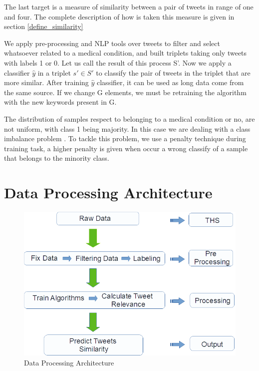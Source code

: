 \documentclass[12pt]{report}
\begin{document}
The last target is a measure of similarity between a pair of tweets in range of one and four. The complete description of how is taken this measure is given in section \ref{define_similarity}

We apply pre-processing and \ac{NLP} tools over tweets to filter and select whatsoever related to a medical condition, and built triplets taking only tweets with labels 1 or 0. Let us call the result of this process S'. Now we apply a classifier $\hat{y}$ in a triplet $s' \in S'$ to classify the pair of tweets in the triplet that are more similar. After training $\hat{y}$ classifier, it can be used as long data come from the same source. If we change G elements, we must be retraining the algorithm with the new keywords present in G.

The distribution of samples respect to belonging to a medical condition or no, are not uniform, with class 1 being majority. In this case we are dealing with a class imbalance problem \cite{Batista2004} \cite{He2009}. To tackle this problem, we use a penalty technique during training task, a higher penalty is given when occur a wrong classify of a sample that belongs to the minority class.

\section{Data Processing Architecture}

\begin{figure}[H]	
	\centering
	\includegraphics[width=150mm, scale = 1]{images/5_data_processing.png}	
	\caption{Data Processing Architecture}	
	\label{figure:data_processing}
\end{figure}
\end{document}
